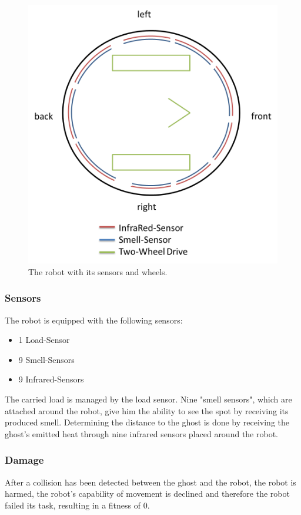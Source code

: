 \documentclass[12pt,fleqn,a4paper]{article}
\begin{document}
\begin{figure}[h]
\centering
\includegraphics[scale=0.333]{img/robot_neu.png}
\caption{The robot with its sensors and wheels.}
\label{fig:robot}
\end{figure}

\subsubsection{Sensors}
The robot is equipped with the following sensors:
\begin{itemize}
   \item 1 Load-Sensor
   \item 9 Smell-Sensors
   \item 9 Infrared-Sensors
\end{itemize}
The carried load is managed by the load sensor. Nine "smell sensors", which are attached around the robot, give him the ability to see the spot by receiving its produced smell. Determining the distance to the ghost is done by receiving the ghost's emitted heat through nine infrared sensors placed around the robot.

\subsubsection{Damage}
After a collision has been detected between the ghost and the robot, the robot is harmed, the robot's capability of movement is declined and therefore the robot failed its task, resulting in a fitness of 0.
\end{document}
